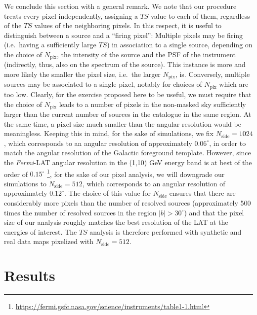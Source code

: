 \documentclass{article}
\newcommand{\Fermi}{\textit{Fermi}}
\begin{document}
\medskip
We conclude this section with a general remark. We note that our procedure treats every pixel independently, assigning a $TS$ value to each of them, regardless of the $TS$ values of the neighboring pixels. In this respect, it is  useful to distinguish between a source and a ``firing pixel'': Multiple pixels may be firing (i.e.~having a sufficiently large $TS$) in association to a single source, depending on the choice of $N_\textrm{pix}$, the intensity of the source and the PSF of the instrument (indirectly, thus, also on the spectrum of the source). This instance is more and more likely the smaller the pixel size, i.e.~the larger $N_\textrm{pix}$, is. Conversely, multiple sources may be associated to a single pixel, notably for choices of $N_\textrm{pix}$ which are too low. Clearly, for the exercise proposed here to be useful, we must require that the choice of $N_\textrm{pix}$ leads to a number of pixels in the non-masked sky sufficiently larger than the current number of sources in the catalogue in the same region. At the same time, a pixel size  much smaller than the angular resolution would be meaningless. Keeping this in mind, for the sake of simulations, we fix $N_\textrm{side}=1024$, which corresponds to an angular resolution of approximately $0.06^\circ$, in order to match the angular resolution of the Galactic foreground template. However, since the \Fermi-LAT angular resolution in the (1,10) GeV energy band is at best of the order of $0.15^\circ$ \footnote{\href{https://fermi.gsfc.nasa.gov/science/instruments/table1-1.html}{https://fermi.gsfc.nasa.gov/science/instruments/table1-1.html}}, for the sake of our pixel analysis, we will downgrade our simulations to $N_\textrm{side}=512$, which corresponds to an angular resolution of approximately $0.12^\circ$. The choice of this value for $N_\textrm{side}$ ensures that there are considerably more pixels than the number of resolved sources (approximately 500 times the number of resolved sources in the region $|b|>30^\circ$) and that the pixel size  of our analysis roughly matches the best resolution of the LAT at the energies of interest.
The $TS$ analysis is therefore performed with synthetic and real data maps pixelized with $N_\textrm{side}=512$.


\section{Results}
\label{sec:catalogue}
\end{document}
